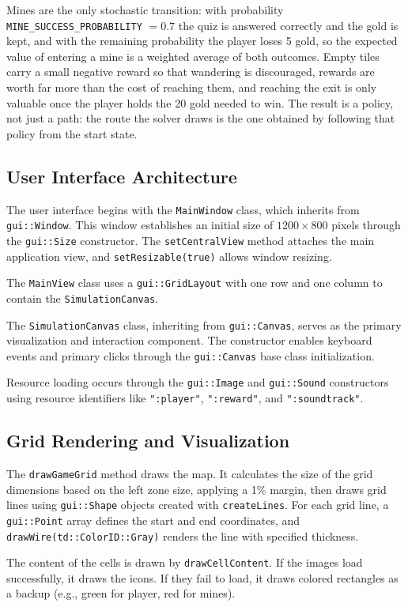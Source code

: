 \documentclass[12pt, a4paper]{article}
\newcommand{\code}[1]{\texttt{#1}}
\begin{document}
Mines are the only stochastic transition: with probability \code{MINE\_SUCCESS\_PROBABILITY} $= 0.7$ the quiz is answered correctly and the gold is kept, and with the remaining probability the player loses 5 gold, so the expected value of entering a mine is a weighted average of both outcomes. Empty tiles carry a small negative reward so that wandering is discouraged, rewards are worth far more than the cost of reaching them, and reaching the exit is only valuable once the player holds the 20 gold needed to win. The result is a policy, not just a path: the route the solver draws is the one obtained by following that policy from the start state.

\subsection{User Interface Architecture}
The user interface begins with the \code{MainWindow} class, which inherits from \code{gui::Window}. This window establishes an initial size of $1200 \times 800$ pixels through the \code{gui::Size} constructor. The \code{setCentralView} method attaches the main application view, and \code{setResizable(true)} allows window resizing.

The \code{MainView} class uses a \code{gui::GridLayout} with one row and one column to contain the \code{SimulationCanvas}.

The \code{SimulationCanvas} class, inheriting from \code{gui::Canvas}, serves as the primary visualization and interaction component. The constructor enables keyboard events and primary clicks through the \code{gui::Canvas} base class initialization.

Resource loading occurs through the \code{gui::Image} and \code{gui::Sound} constructors using resource identifiers like \code{":player"}, \code{":reward"}, and \code{":soundtrack"}.

\subsection{Grid Rendering and Visualization}
The \code{drawGameGrid} method draws the map. It calculates the size of the grid dimensions based on the left zone size, applying a 1\% margin, then draws grid lines using \code{gui::Shape} objects created with \code{createLines}. For each grid line, a \code{gui::Point} array defines the start and end coordinates, and \code{drawWire(td::ColorID::Gray)} renders the line with specified thickness.

The content of the cells is drawn by \code{drawCellContent}. If the images load successfully, it draws the icons. If they fail to load, it draws colored rectangles as a backup (e.g., green for player, red for mines).
\end{document}
